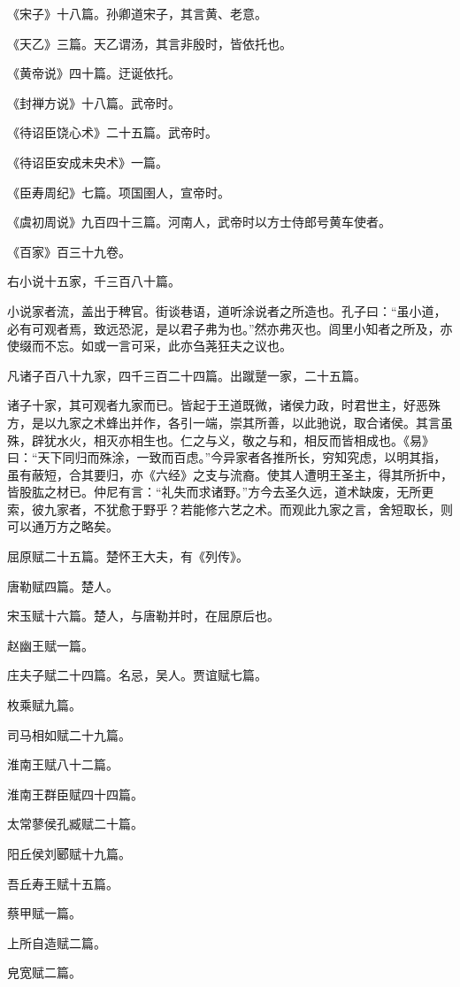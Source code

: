\documentclass[]{article}
\begin{document}
《宋子》十八篇。孙卿道宋子，其言黄、老意。

《天乙》三篇。天乙谓汤，其言非殷时，皆依托也。

《黄帝说》四十篇。迂诞依托。

《封禅方说》十八篇。武帝时。

《待诏臣饶心术》二十五篇。武帝时。

《待诏臣安成未央术》一篇。

《臣寿周纪》七篇。项国圉人，宣帝时。

《虞初周说》九百四十三篇。河南人，武帝时以方士侍郎号黄车使者。

《百家》百三十九卷。

右小说十五家，千三百八十篇。

小说家者流，盖出于稗官。街谈巷语，道听涂说者之所造也。孔子曰：``虽小道，必有可观者焉，致远恐泥，是以君子弗为也。''然亦弗灭也。闾里小知者之所及，亦使缀而不忘。如或一言可采，此亦刍荛狂夫之议也。

凡诸子百八十九家，四千三百二十四篇。出蹴蹵一家，二十五篇。

诸子十家，其可观者九家而已。皆起于王道既微，诸侯力政，时君世主，好恶殊方，是以九家之术蜂出并作，各引一端，崇其所善，以此驰说，取合诸侯。其言虽殊，辟犹水火，相灭亦相生也。仁之与义，敬之与和，相反而皆相成也。《易》曰：``天下同归而殊涂，一致而百虑。''今异家者各推所长，穷知究虑，以明其指，虽有蔽短，合其要归，亦《六经》之支与流裔。使其人遭明王圣主，得其所折中，皆股肱之材已。仲尼有言：``礼失而求诸野。''方今去圣久远，道术缺废，无所更索，彼九家者，不犹愈于野乎？若能修六艺之术。而观此九家之言，舍短取长，则可以通万方之略矣。

屈原赋二十五篇。楚怀王大夫，有《列传》。

唐勒赋四篇。楚人。

宋玉赋十六篇。楚人，与唐勒并时，在屈原后也。

赵幽王赋一篇。

庄夫子赋二十四篇。名忌，吴人。贾谊赋七篇。

枚乘赋九篇。

司马相如赋二十九篇。

淮南王赋八十二篇。

淮南王群臣赋四十四篇。

太常蓼侯孔臧赋二十篇。

阳丘侯刘郾赋十九篇。

吾丘寿王赋十五篇。

蔡甲赋一篇。

上所自造赋二篇。

皃宽赋二篇。
\end{document}
